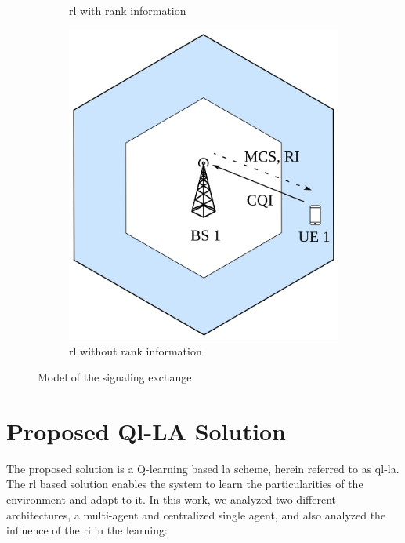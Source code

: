 \begin{figure}
\begin{subfigure}[htb]{0.3\textwidth}
         \caption{\gls{rl} with rank information}
         \label{fig:la-system-model-2}
     \end{subfigure}
     \hfill
     \begin{subfigure}[htb]{0.3\textwidth}
         \centering
         \includegraphics[width=\textwidth]{figures/chp_la/system_model_3.png}
         \caption{\gls{rl} without rank information}
         \label{fig:la-system-model-3}
     \end{subfigure}
        \caption{Model of the signaling exchange}
        \label{fig:la-system-model}
\end{figure}




\section{Proposed Ql-LA Solution}
\label{sec:la-proposed}

The proposed solution is a Q-learning based \gls{la} scheme, herein referred to as \gls{ql-la}.
%
The \gls{rl} based solution enables the system to learn the particularities of the environment and adapt to it.
%
In this work, we analyzed two different architectures, a multi-agent and centralized single agent, and also analyzed the influence of the \gls{ri} in the learning:


